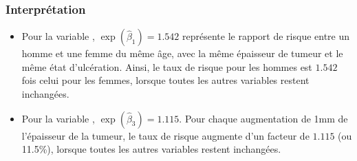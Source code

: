 \documentclass{beamer}
\begin{document}
\begin{frame}
\frametitle{Interprétation}
\begin{itemize}
\item Pour la variable , $\exp(\widehat{\beta}_1)=1.542$ représente le rapport de risque entre un homme et une femme du même âge, avec la même épaisseur de tumeur et le même état d'ulcération. Ainsi, le taux de risque pour les hommes est $1.542$ fois celui pour les femmes, lorsque toutes les autres variables restent inchangées.
\item Pour la variable , $\exp(\widehat{\beta}_3)=1.115$. Pour chaque augmentation de 1mm de l'épaisseur de la tumeur, le taux de risque augmente d'un facteur de $1.115$ (ou 11.5\%), lorsque toutes les autres variables restent inchangées. 
\end{itemize}
\end{frame}
% 
% 
% 
\end{document}
